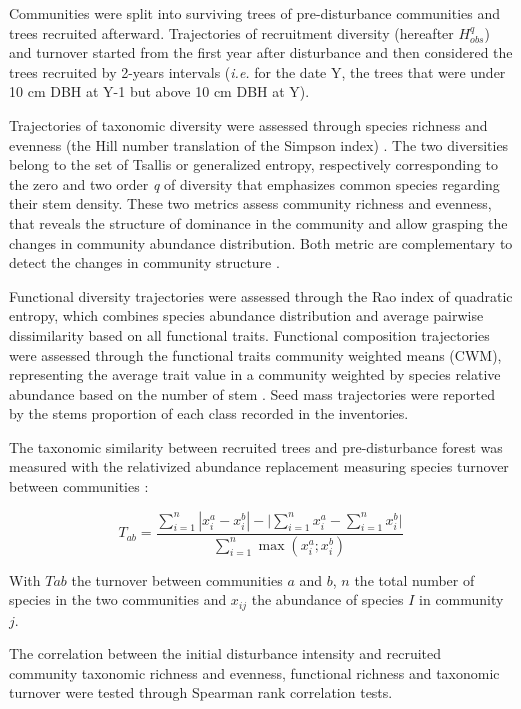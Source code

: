 \documentclass[fleqn,10pt]{ArtEcoFoG} %
\begin{document}
Communities were split into surviving trees of pre-disturbance
communities and trees recruited afterward. Trajectories of recruitment
diversity (hereafter \(H^q_{obs}\)) and turnover started from the first
year after disturbance and then considered the trees recruited by
2-years intervals (\emph{i.e.} for the date Y, the trees that were under
10 cm DBH at Y-1 but above 10 cm DBH at Y).

Trajectories of taxonomic diversity were assessed through species
richness and evenness (the Hill number translation of the Simpson index)
\citep{Chao2015, Marcon2015}. The two diversities belong to the set of
Tsallis or generalized entropy, respectively corresponding to the zero
and two order \emph{q} of diversity that emphasizes common species
regarding their stem density. These two metrics assess community
richness and evenness, that reveals the structure of dominance in the
community and allow grasping the changes in community abundance
distribution. Both metric are complementary to detect the changes in
community structure \citep{Magurran2004}.

Functional diversity trajectories were assessed through the Rao index of
quadratic entropy, which combines species abundance distribution and
average pairwise dissimilarity based on all functional traits.
Functional composition trajectories were assessed through the functional
traits community weighted means (CWM), representing the average trait
value in a community weighted by species relative abundance based on the
number of stem \citep{Diaz2007}. Seed mass trajectories were reported by
the stems proportion of each class recorded in the inventories.

The taxonomic similarity between recruited trees and pre-disturbance
forest was measured with the relativized abundance replacement measuring
species turnover between communities \citep{Podani2013a}:

\begin{equation}
T_{ab}=\frac{\sum_{i=1}^{n}|x_i^a - x_i^b| - \bigg| \sum_{i=1}^{n}{x_i^a} - \sum_{i=1}^{n}{x_i^b} \bigg|}{\sum_{i=1}^{n}\max{\left( x_i^a;x_i^b \right)}}
\label{eq:formNestedness}
\end{equation}

With \(Tab\) the turnover between communities \(a\) and \(b\), \(n\) the
total number of species in the two communities and \(x_{ij}\) the
abundance of species \(I\) in community \(j\).

The correlation between the initial disturbance intensity and recruited
community taxonomic richness and evenness, functional richness and
taxonomic turnover were tested through Spearman rank correlation tests.
\end{document}
